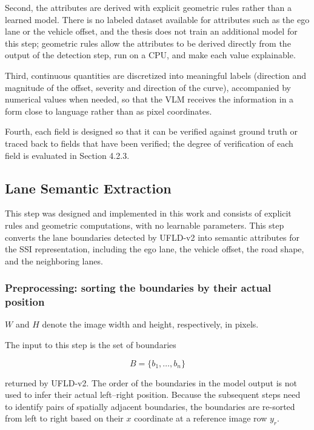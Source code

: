 \documentclass[12pt,a4paper]{report}
\begin{document}
Second, the attributes are derived with explicit geometric rules rather than a learned model. There is no labeled dataset available for attributes such as the ego lane or the vehicle offset, and the thesis does not train an additional model for this step; geometric rules allow the attributes to be derived directly from the output of the detection step, run on a CPU, and make each value explainable.

Third, continuous quantities are discretized into meaningful labels (direction and magnitude of the offset, severity and direction of the curve), accompanied by numerical values when needed, so that the VLM receives the information in a form close to language rather than as pixel coordinates.

Fourth, each field is designed so that it can be verified against ground truth or traced back to fields that have been verified; the degree of verification of each field is evaluated in Section 4.2.3.
\subsection{Lane Semantic Extraction}

This step was designed and implemented in this work and consists of explicit rules and geometric computations, with no learnable parameters. This step converts the lane boundaries detected by UFLD-v2 into semantic attributes for the SSI representation, including the ego lane, the vehicle offset, the road shape, and the neighboring lanes.

\subsubsection*{Preprocessing: sorting the boundaries by their actual position}

$W$ and $H$ denote the image width and height, respectively, in pixels.

The input to this step is the set of boundaries

\begin{equation}
B=\{b_1,\ldots,b_n\}
\label{eq:3.4}
\end{equation}

returned by UFLD-v2. The order of the boundaries in the model output is not used to infer their actual left--right position. Because the subsequent steps need to identify pairs of spatially adjacent boundaries, the boundaries are re-sorted from left to right based on their $x$ coordinate at a reference image row $y_r$.
\end{document}
